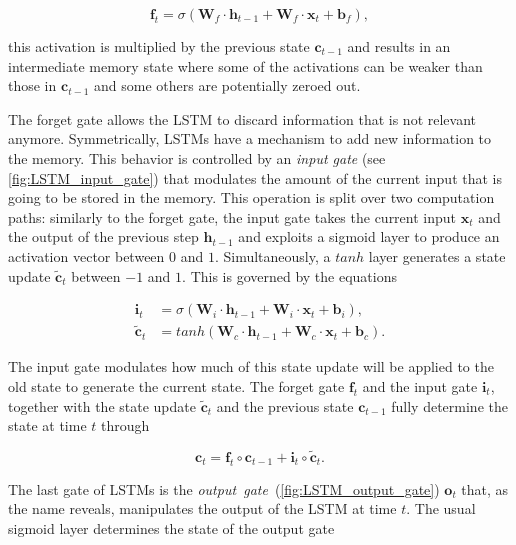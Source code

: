 \begin{equation}\label{eq:LSTM_forget_gate}
\mathbf{f}_t = \sigma\left(\mathbf{W}_f \cdot \mathbf{h}_{t-1} +
\mathbf{W}_f \cdot \mathbf{x}_t + \mathbf{b}_f \right),
\end{equation}

this activation is multiplied by the previous state $\mathbf{c}_{t-1}$ and results in an intermediate memory state where some of the activations can be weaker than those in $\mathbf{c}_{t-1}$ and some others are potentially zeroed out.

The forget gate allows the LSTM to discard information that is not relevant anymore. Symmetrically, LSTMs have a mechanism to add new information to the memory. This behavior is controlled by an \emph{input gate} (see
\ref{fig:LSTM_input_gate}) that modulates the amount of the current input that is going to be stored in the memory. This operation is split over two computation paths: similarly to the forget gate, the input gate takes the current input $\mathbf{x}_t$ and the output of the previous step $\mathbf{h}_{t-1}$ and exploits a sigmoid layer to produce an activation vector between $0$ and $1$.  Simultaneously, a $tanh$ layer generates a state update $\mathbf{\tilde c}_t$ between $-1$ and $1$. This is governed by the equations

\begin{equation}\label{eq:LSTM_input_gate}
\begin{split}
\mathbf{i}_t &= \sigma\left(\mathbf{W}_i \cdot \mathbf{h}_{t-1} +
\mathbf{W}_i \cdot \mathbf{x}_t + \mathbf{b}_i \right),\\
\mathbf{\tilde c}_t &= tanh \left(\mathbf{W}_c \cdot
\mathbf{h}_{t-1} + \mathbf{W}_c \cdot \mathbf{x}_t +
\mathbf{b}_c \right).
\end{split}
\end{equation}

The input gate modulates how much of this state update will be applied to the old state to generate the current state. The forget gate $\mathbf{f}_t$ and the input gate $\mathbf{i}_t$, together with the state update $\mathbf{\tilde c}_t$ and the previous state $\mathbf{c}_{t-1}$ fully determine the state at time $t$ through

\begin{equation}\label{eq:LSTM_state_update}
\mathbf{c}_t = \mathbf{f}_t \circ \mathbf{c}_{t-1} +
\mathbf{i}_t \circ \mathbf{\tilde c}_t.
\end{equation}

The last gate of LSTMs is the \emph{output~gate}~(\ref{fig:LSTM_output_gate}) $\mathbf{o}_t$ that, as the name reveals, manipulates the output of the LSTM at time $t$. The usual sigmoid layer determines the state of the output gate

